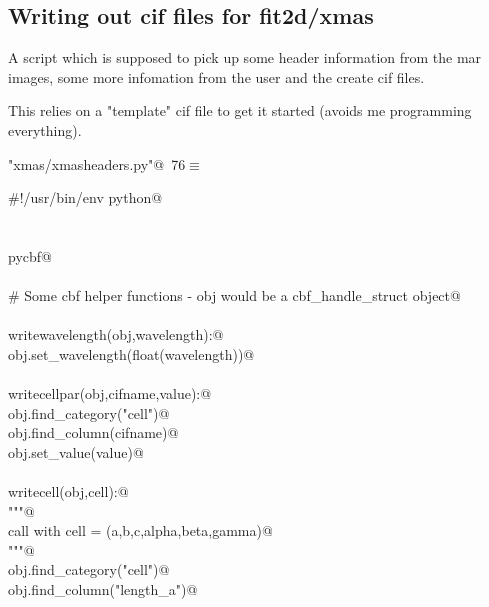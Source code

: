 \documentclass[10pt,a4paper,twoside,notitlepage]{article}
\begin{document}
\subsection{Writing out cif files for fit2d/xmas}

A script which is supposed to pick up some header information from the mar images, 
some more infomation from the user and the create cif files.

This relies on a "template" cif file to get it started (avoids me programming everything).

\begin{flushleft} \small
\begin{minipage}{\linewidth}\label{scrap19}\raggedright\small
{} \verb@"xmas/xmasheaders.py"@\nobreak\ {\footnotesize {76}}$\equiv$
\vspace{-1ex}
\begin{list}{}{} \item
\mbox{}\verb@#!/usr/bin/env python@\\
\mbox{}\verb@@\\
\mbox{}\verb@@\\
\mbox{}\verb@import pycbf@\\
\mbox{}\verb@@\\
\mbox{}\verb@# Some cbf helper functions - obj would be a cbf_handle_struct object@\\
\mbox{}\verb@@\\
\mbox{}\verb@def writewavelength(obj,wavelength):@\\
\mbox{}\verb@    obj.set_wavelength(float(wavelength))@\\
\mbox{}\verb@@\\
\mbox{}\verb@def writecellpar(obj,cifname,value):@\\
\mbox{}\verb@    obj.find_category("cell")@\\
\mbox{}\verb@    obj.find_column(cifname)@\\
\mbox{}\verb@    obj.set_value(value)@\\
\mbox{}\verb@@\\
\mbox{}\verb@def writecell(obj,cell):@\\
\mbox{}\verb@    """@\\
\mbox{}\verb@    call with cell = (a,b,c,alpha,beta,gamma)@\\
\mbox{}\verb@    """@\\
\mbox{}\verb@    obj.find_category("cell")@\\
\mbox{}\verb@    obj.find_column("length_a")@\\

\end{list}
\end{minipage}
\end{flushleft}
\end{document}
